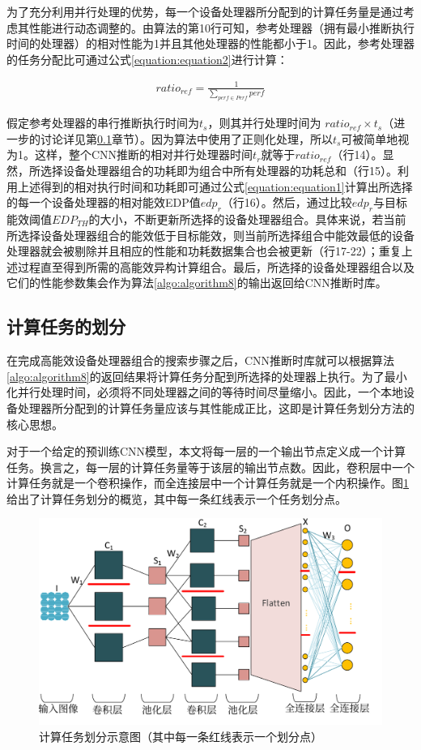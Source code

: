 为了充分利用并行处理的优势，每一个设备处理器所分配到的计算任务量是通过考虑其性能进行动态调整的。由算法的第10行可知，参考处理器（拥有最小推断执行时间的处理器）的相对性能为1并且其他处理器的性能都小于1。因此，参考处理器的任务分配比可通过公式\ref{equation:equation2}进行计算：

\begin{equation}
     \label{equation:equation2}
     \begin{aligned}
        ratio_{ref}=\frac{1}{\sum_{perf \in Perf}perf}
     \end{aligned}
\end{equation}

\noindent 假定参考处理器的串行推断执行时间为$t_s$，则其并行处理时间为 $ratio_{ref} \times t_s$（进一步的讨论详见第\ref{chapter:chapter4-3-2}章节）。因为算法中使用了正则化处理，所以$t_s$可被简单地视为1。这样，整个CNN推断的相对并行处理器时间$t_r$就等于$ratio_{ref}$（行14）。显然，所选择设备处理器组合的功耗即为组合中所有处理器的功耗总和（行15）。利用上述得到的相对执行时间和功耗即可通过公式\ref{equation:equation1}计算出所选择的每一个设备处理器的相对能效EDP值$edp_r$（行16）。然后，通过比较$edp_r$与目标能效阈值$EDP_{TH}$的大小，不断更新所选择的设备处理器组合。具体来说，若当前所选择设备处理器组合的能效低于目标能效，则当前所选择组合中能效最低的设备处理器就会被剔除并且相应的性能和功耗数据集合也会被更新（行17-22）；重复上述过程直至得到所需的高能效异构计算组合。最后，所选择的设备处理器组合以及它们的性能参数集会作为算法\ref{algo:algorithm8}的输出返回给CNN推断时库。


\subsection{计算任务的划分}
\label{chapter:chapter4-3-2}

在完成高能效设备处理器组合的搜索步骤之后，CNN推断时库就可以根据算法\ref{algo:algorithm8}的返回结果将计算任务分配到所选择的处理器上执行。为了最小化并行处理时间，必须将不同处理器之间的等待时间尽量缩小。因此，一个本地设备处理器所分配到的计算任务量应该与其性能成正比，这即是计算任务划分方法的核心思想。

对于一个给定的预训练CNN模型，本文将每一层的一个输出节点定义成一个计算任务。换言之，每一层的计算任务量等于该层的输出节点数。因此，卷积层中一个计算任务就是一个卷积操作，而全连接层中一个计算任务就是一个内积操作。图\ref{figure:figure30}给出了计算任务划分的概览，其中每一条红线表示一个任务划分点。

\begin{figure}[htbp]
    \centering
    \includegraphics[height=0.4\textwidth]{figures/compute_tasks.pdf}
    \caption{计算任务划分示意图（其中每一条红线表示一个划分点）}\label{figure:figure30}
\end{figure}

